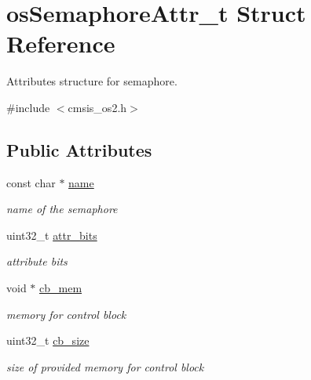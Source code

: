 \hypertarget{structos_semaphore_attr__t}{}\section{os\+Semaphore\+Attr\+\_\+t Struct Reference}
\label{structos_semaphore_attr__t}


Attributes structure for semaphore.  




{\ttfamily \#include $<$cmsis\+\_\+os2.\+h$>$}

\subsection*{Public Attributes}
\begin{DoxyCompactItemize}
\item 
\mbox{\label{structos_semaphore_attr__t_a0151928f02ecbbc0a22793a63892af66}} 
const char $\ast$ \mbox{\hyperlink{structos_semaphore_attr__t_a0151928f02ecbbc0a22793a63892af66}{name}}
\begin{DoxyCompactList}\small\item\em name of the semaphore \end{DoxyCompactList}\item 
\mbox{\label{structos_semaphore_attr__t_a718a87b56a768a4f358a90f8c09b1aab}} 
uint32\+\_\+t \mbox{\hyperlink{structos_semaphore_attr__t_a718a87b56a768a4f358a90f8c09b1aab}{attr\+\_\+bits}}
\begin{DoxyCompactList}\small\item\em attribute bits \end{DoxyCompactList}\item 
\mbox{\label{structos_semaphore_attr__t_adcabe022804af99fc5a4477dd95c8003}} 
void $\ast$ \mbox{\hyperlink{structos_semaphore_attr__t_adcabe022804af99fc5a4477dd95c8003}{cb\+\_\+mem}}
\begin{DoxyCompactList}\small\item\em memory for control block \end{DoxyCompactList}\item 
\mbox{\label{structos_semaphore_attr__t_aa674886431b3111d252bb90b6f911d32}} 
uint32\+\_\+t \mbox{\hyperlink{structos_semaphore_attr__t_aa674886431b3111d252bb90b6f911d32}{cb\+\_\+size}}
\begin{DoxyCompactList}\small\item\em size of provided memory for control block \end{DoxyCompactList}\end{DoxyCompactItemize}


